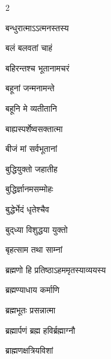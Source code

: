 \begin{multicols}{2}
\begin{indexlist}
\item बन्धुरात्माऽऽत्मनस्तस्य \dotfill {}
\item बलं बलवतां चाहं \dotfill {}
\item बहिरन्तश्च भूतानामचरं \dotfill {}
\item बहूनां जन्मनामन्ते \dotfill {}
\item बहूनि मे व्यतीतानि \dotfill {}
\item बाह्यस्पर्शेष्वसक्तात्मा \dotfill {}
\item बीजं मां सर्वभूतानां \dotfill {}
\item बुद्धियुक्तो जहातीह \dotfill {}
\item बुद्धिर्ज्ञानमसम्मोहः \dotfill {}
\item बुद्धेर्भेदं धृतेश्चैव \dotfill {}
\item बुद्‌ध्या विशुद्धया युक्तो \dotfill {}
\item बृहत्साम तथा साम्नां \dotfill {}
\item ब्रह्मणो हि प्रतिष्ठाऽहममृतस्याव्ययस्य \dotfill {}
\item ब्रह्मण्याधाय कर्माणि \dotfill {}
\item ब्रह्मभूतः प्रसन्नात्मा \dotfill {}
\item ब्रह्मार्पणं ब्रह्म हविर्ब्रह्माग्नौ \dotfill {}
\item ब्राह्मणक्षत्रियविशां \dotfill {}
\end{indexlist}


\end{multicols}
